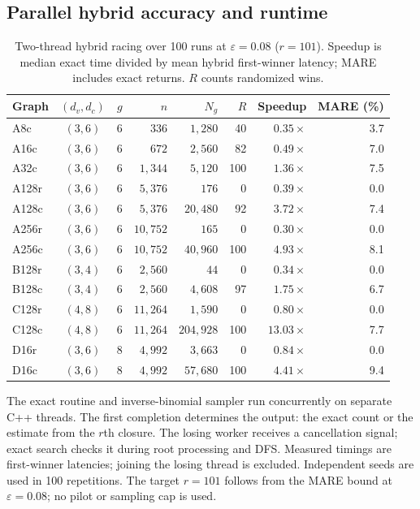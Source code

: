 \subsection{Parallel hybrid accuracy and runtime}

\begin{table}[!ht]
\centering
\caption{Two-thread hybrid racing over 100 runs at $\varepsilon=0.08$
($r=101$). Speedup is median exact time divided by mean hybrid
first-winner latency; MARE includes exact returns. $R$ counts randomized wins.}
\label{tab:hybrid-exp}
\footnotesize
\setlength{\tabcolsep}{3.6pt}
\begin{tabular}{lccrrrrr}
\hline
Graph & $(d_v,d_c)$ & $g$ & $n$ & $N_g$ & $R$
& Speedup & MARE (\%)\\
\hline
A8c & $(3,6)$ & 6 & $336$ & $1,280$ & 40 & $0.35\times$ & 3.7\\
A16c & $(3,6)$ & 6 & $672$ & $2,560$ & 82 & $0.49\times$ & 7.0\\
A32c & $(3,6)$ & 6 & $1,344$ & $5,120$ & 100 & $1.36\times$ & 7.5\\
A128r & $(3,6)$ & 6 & $5,376$ & $176$ & 0 & $0.39\times$ & 0.0\\
A128c & $(3,6)$ & 6 & $5,376$ & $20,480$ & 92 & $3.72\times$ & 7.4\\
A256r & $(3,6)$ & 6 & $10,752$ & $165$ & 0 & $0.30\times$ & 0.0\\
A256c & $(3,6)$ & 6 & $10,752$ & $40,960$ & 100 & $4.93\times$ & 8.1\\
B128r & $(3,4)$ & 6 & $2,560$ & $44$ & 0 & $0.34\times$ & 0.0\\
B128c & $(3,4)$ & 6 & $2,560$ & $4,608$ & 97 & $1.75\times$ & 6.7\\
C128r & $(4,8)$ & 6 & $11,264$ & $1,590$ & 0 & $0.80\times$ & 0.0\\
C128c & $(4,8)$ & 6 & $11,264$ & $204,928$ & 100 & $13.03\times$ & 7.7\\
D16r & $(3,6)$ & 8 & $4,992$ & $3,663$ & 0 & $0.84\times$ & 0.0\\
D16c & $(3,6)$ & 8 & $4,992$ & $57,680$ & 100 & $4.41\times$ & 9.4\\
\hline
\end{tabular}
\end{table}

The exact routine and inverse-binomial sampler run concurrently on
separate C++ threads. The first completion determines the output:
the exact count or the estimate from the $r$th closure. The losing
worker receives a cancellation signal; exact search checks it during
root processing and DFS. Measured timings are first-winner latencies;
joining the losing thread is excluded. Independent seeds are used in
100 repetitions. The target $r=101$ follows from the MARE bound at
$\varepsilon=0.08$; no pilot or sampling cap is used.

